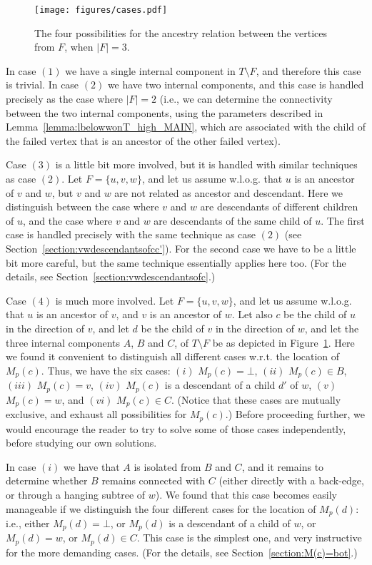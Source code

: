 \documentclass[11pt,a4paper]{article}
\begin{document}
\begin{figure}[h!]
\texttt{[image: figures/cases.pdf]}
\caption{\small{The four possibilities for the ancestry relation between the vertices from $F$, when $|F|=3$.}}\label{figure:cases}
\end{figure}

In case $(1)$ we have a single internal component in $T\setminus F$, and therefore this case is trivial. In case $(2)$ we have two internal components, and this case is handled precisely as the case where $|F|=2$ (i.e., we can determine the connectivity between the two internal components, using the parameters described in Lemma~\ref{lemma:lbelowwonT_high_MAIN}, which are associated with the child of the failed vertex that is an ancestor of the other failed vertex). 

Case $(3)$ is a little bit more involved, but it is handled with similar techniques as case $(2)$. Let $F=\{u,v,w\}$, and let us assume w.l.o.g. that $u$ is an ancestor of $v$ and $w$, but $v$ and $w$ are not related as ancestor and descendant. Here we distinguish between the case where $v$ and $w$ are descendants of different children of $u$, and the case where $v$ and $w$ are descendants of the same child of $u$. The first case is handled precisely with the same technique as case $(2)$ (see Section~\ref{section:vwdescendantsofcc'}). For the second case we have to be a little bit more careful, but the same technique essentially applies here too. (For the details, see Section~\ref{section:vwdescendantsofc}.) 

Case $(4)$ is much more involved. Let $F=\{u,v,w\}$, and let us assume w.l.o.g. that $u$ is an ancestor of $v$, and $v$ is an ancestor of $w$. Let also $c$ be the child of $u$ in the direction of $v$, and let $d$ be the child of $v$ in the direction of $w$, and let the three internal components $A$, $B$ and $C$, of $T\setminus F$ be as depicted in Figure~\ref{figure:cases}. Here we found it convenient to distinguish all different cases w.r.t. the location of $M_p(c)$. Thus, we have the six cases: $(i)$ $M_p(c)=\bot$, $(ii)$ $M_p(c)\in B$, $(iii)$ $M_p(c)=v$, $(iv)$ $M_p(c)$ is a descendant of a child $d'$ of $w$, $(v)$ $M_p(c)=w$, and $(vi)$ $M_p(c)\in C$. (Notice that these cases are mutually exclusive, and exhaust all possibilities for $M_p(c)$.) Before proceeding further, we would encourage the reader to try to solve some of those cases independently, before studying our own solutions.

In case $(i)$ we have that $A$ is isolated from $B$ and $C$, and it remains to determine whether $B$ remains connected with $C$ (either directly with a back-edge, or through a hanging subtree of $w$). We found that this case becomes easily manageable if we distinguish the four different cases for the location of $M_p(d)$: i.e., either $M_p(d)=\bot$, or $M_p(d)$ is a descendant of a child of $w$, or $M_p(d)=w$, or $M_p(d)\in C$. This case is the simplest one, and very instructive for the more demanding cases. (For the details, see Section~\ref{section:M(c)=bot}.)
\end{document}
